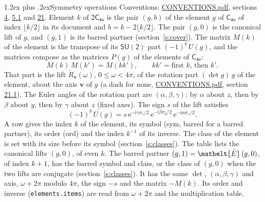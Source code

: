 \documentclass[10pt,a4paper]{article}
\makeatletter
\renewcommand\section{\@startsection{section}{1}{\z@}{-3ex plus -1ex minus -.2ex}%
  {1.2ex plus .2ex}{\normalfont\large\sffamily\bfseries\color{parttitle}}}
\numberwithin{equation}{section}
\newcommand{\eltfont}[1]{{\let\sigma\eltsigma\mathelt{#1}}}
\newcommand{\grp}[1]{\mathsf{#1}}
\newcommand{\elt}[1]{\eltfont{#1}}
\newcommand{\vv}{\mathbf{v}}
\newcommand{\iunit}{\mathrm{i}}
\newcommand{\expe}{\mathrm{e}}
\newcommand{\barred}[1]{\bar{#1}}
\newcommand{\lift}[1]{\tilde{#1}}
\newcommand{\pauli}[1]{\sigma_{#1}}
\makeatother
\begin{document}
\section{Symmetry operations}\label{s:elements}
Conventions: \href{../../CONVENTIONS.pdf}{CONVENTIONS.pdf}, sections \href{../../../rotation/CONVENTIONS.pdf\#conv.4}{4}, \href{../../../rotation/CONVENTIONS.pdf\#conv.5.1}{5.1} and \href{../../CONVENTIONS.pdf\#conv.21}{21}.
\leavevmode\label{n:index.element}\label{n:element.g}Element $k$ of $\grp{2C_{4v}}$ is the pair $(g, b)$ of the element $g$ of \href{../../../rotation/data/pdf/C4v.pdf}{$\grp{C_{4v}}$} of index $\lfloor k/2\rfloor$ in its document and $b = k - 2\lfloor k/2\rfloor$. The pair $(g, 0)$ is the canonical lift of $g$, and $(g, 1)$ is its barred partner (section~\ref{s:cover}). \label{n:matrix.element.pin}\label{n:matrix.element}The matrix $M(k)$ of the element is the transpose of its $\grp{SU(2)}$ part $(-1)^{b}\,U(g)$, and the matrices compose as the matrices $P(g)$ of the elements of $\grp{C_{4v}}$:
\begin{equation}\label{e:mprod}M(k)\,M(k') = M(kk'),\qquad kk' = \text{first } k\text{, then } k'.\end{equation}
\leavevmode\label{n:angle.omega}\label{n:vector.axis}\label{n:vector.pole}That part is the lift $\lift{R}_{\vv}(\omega)$, $0 \le \omega < 4\pi$, of the rotation part $(\det g)\,g$ of the element, about the axis $\vv$ of $g$ (a dash for none, \href{../../CONVENTIONS.pdf}{CONVENTIONS.pdf}, section \href{../../CONVENTIONS.pdf\#conv.21.1}{21.1}). \label{n:angle.euler.alpha}\label{n:angle.euler.beta}\label{n:angle.euler.gamma}\label{n:vector.coordinates}The Euler angles of the rotation part are $(\alpha,\beta,\gamma)$: by $\alpha$ about $z$, then by $\beta$ about $y$, then by $\gamma$ about $z$ (fixed axes). \label{n:local.euler.sign}The sign $s$ of the lift satisfies
\begin{equation}\label{e:euler}(-1)^{b}\,U(g) = s\,\expe^{-\iunit\gamma\pauli{z}/2}\,\expe^{-\iunit\beta\pauli{y}/2}\,\expe^{-\iunit\alpha\pauli{z}/2}.\end{equation}
\leavevmode\label{n:index.element.inverse}\label{n:head.sym}\label{n:head.ord}A row gives the index $k$ of the element, its symbol (sym, barred for a barred partner), its order (ord) and the index $k^{-1}$ of its inverse. \label{n:head.class}The class of the element is set with its size before its symbol (section~\ref{s:classes}).
The table lists the canonical lifts $(g, 0)$, of even $k$. The barred partner $(g, 1) = \elt{\barred{E}}\,(g, 0)$, of index $k + 1$, has the barred symbol and class, or the class of $(g, 0)$ when the two lifts are conjugate (section~\ref{s:classes}). It has the same $\det$, $(\alpha,\beta,\gamma)$ and axis, $\omega + 2\pi$ modulo $4\pi$, the sign $-s$ and the matrix $-M(k)$. Its order and inverse (\texttt{elements.items}) are read from $\omega + 2\pi$ and the multiplication table.
\end{document}

